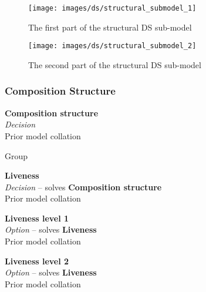\begin{figure}[htb]
	\centering
	\texttt{[image: images/ds/structural\_submodel\_1]}
	\caption{The first part of the structural DS sub-model}
	\label{ds:fig:structural1}
\end{figure}

\begin{figure}[htb]
	\centering
	\texttt{[image: images/ds/structural\_submodel\_2]}
	\caption{The second part of the structural DS sub-model}
	\label{ds:fig:structural2}
\end{figure}

\clearpage

\subsubsection{Composition Structure}

\textbf{Composition structure} \\ \emph{Decision} \\ Prior model collation

Group

\textbf{Liveness} \\ \emph{Decision} -- solves \textbf{Composition structure} \\ Prior model collation \cite{Aghaee2012}


\textbf{Liveness level 1} \\ \emph{Option} -- solves \textbf{Liveness} \\ Prior model collation \cite{Aghaee2012}


\textbf{Liveness level 2} \\ \emph{Option} -- solves \textbf{Liveness} \\ Prior model collation \cite{Aghaee2012}

